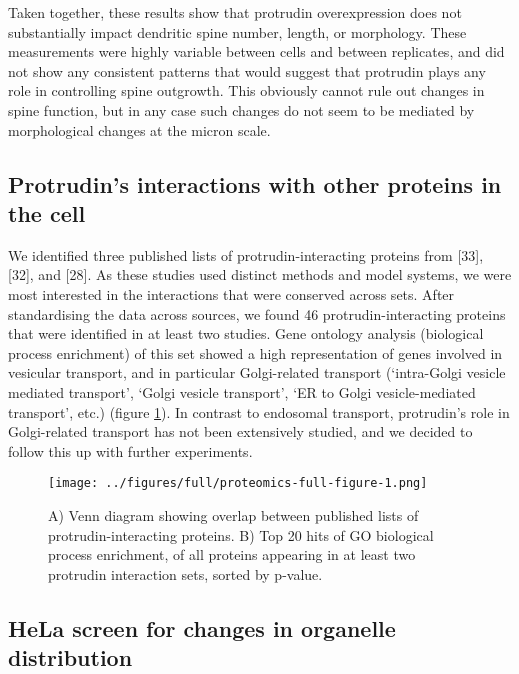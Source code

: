 \documentclass[
  12pt,
  a4paper,
]{book}
\begin{document}
Taken together, these results show that protrudin overexpression does not substantially impact dendritic spine number, length, or morphology. These measurements were highly variable between cells and between replicates, and did not show any consistent patterns that would suggest that protrudin plays any role in controlling spine outgrowth. This obviously cannot rule out changes in spine function, but in any case such changes do not seem to be mediated by morphological changes at the micron scale.

\hypertarget{GO-analysis}{%
\subsection{Protrudin's interactions with other proteins in the cell}\label{GO-analysis}}

We identified three published lists of protrudin-interacting proteins from {[}33{]}, {[}32{]}, and {[}28{]}. As these studies used distinct methods and model systems, we were most interested in the interactions that were conserved across sets. After standardising the data across sources, we found 46 protrudin-interacting proteins that were identified in at least two studies. Gene ontology analysis (biological process enrichment) of this set showed a high representation of genes involved in vesicular transport, and in particular Golgi-related transport (`intra-Golgi vesicle mediated transport', `Golgi vesicle transport', `ER to Golgi vesicle-mediated transport', etc.) (figure \ref{fig:proteomics-full-figure}). In contrast to endosomal transport, protrudin's role in Golgi-related transport has not been extensively studied, and we decided to follow this up with further experiments.

\begin{figure}
\centering
\texttt{[image: ../figures/full/proteomics-full-figure-1.png]}
\caption{\label{fig:proteomics-full-figure}A) Venn diagram showing overlap between published lists of protrudin-interacting proteins. B) Top 20 hits of GO biological process enrichment, of all proteins appearing in at least two protrudin interaction sets, sorted by p-value.}
\end{figure}

\hypertarget{hela-screen-for-changes-in-organelle-distribution}{%
\subsection{HeLa screen for changes in organelle distribution}\label{hela-screen-for-changes-in-organelle-distribution}}
\end{document}
